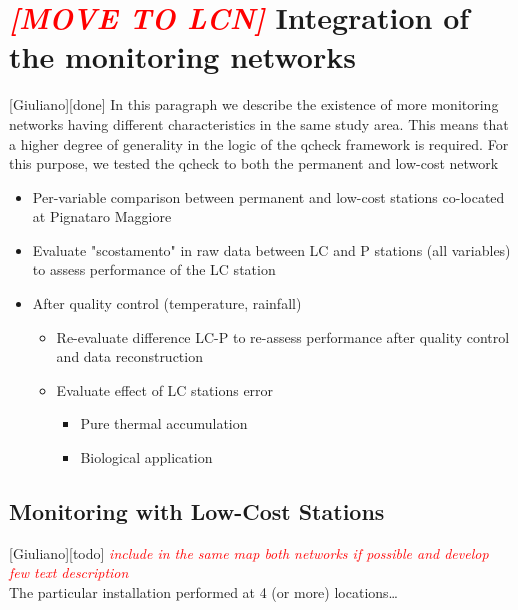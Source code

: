 \documentclass[authoryear,preprint,review,12pt]{elsarticle}
\newcommand{\note}[1]{\emph{\textcolor{red}{#1}}}
\begin{document}
\section{\note{[MOVE TO LCN]} Integration of the monitoring networks\label{Integration}}[Giuliano][done]
In this paragraph we describe the existence of more monitoring networks having different characteristics in the same study area.
This means that a higher degree of generality in the logic of the qcheck framework is required.
For this purpose, we tested the qcheck to both the permanent and low-cost network
\begin{itemize}
    \item Per-variable comparison between permanent and low-cost stations co-located at Pignataro Maggiore
    \item Evaluate "scostamento" in raw data between LC and P stations (all variables) to assess performance of the LC station
    \item After quality control (temperature, rainfall)
    \begin{itemize}
        \item Re-evaluate difference LC-P to re-assess performance after quality control and data reconstruction 
        \item Evaluate effect of LC stations error
        \begin{itemize}
            \item Pure thermal accumulation
            \item Biological application
        \end{itemize}
    \end{itemize}
\end{itemize}

\subsection{Monitoring with Low-Cost Stations}[Giuliano][todo]
\note{include in the same map both networks if possible and develop few text description}\\
The particular installation performed at 4 (or more) locations\ldots



 





\end{document}

